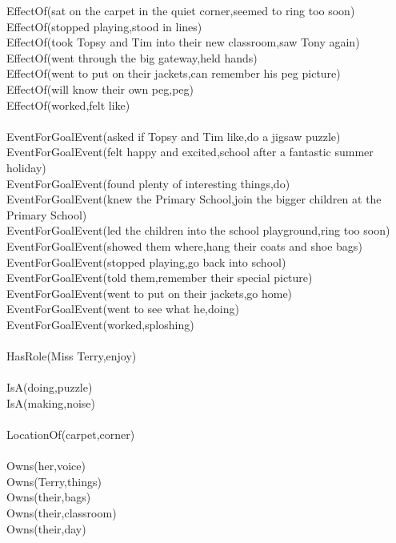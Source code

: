 \begin{multicols}{2}
\begin{footnotesize}
EffectOf(sat on the carpet in the quiet corner,seemed to ring too soon) \\
EffectOf(stopped playing,stood in lines) \\
EffectOf(took Topsy and Tim into their new classroom,saw Tony again) \\
EffectOf(went through the big gateway,held hands) \\
EffectOf(went to put on their jackets,can remember his peg picture) \\
EffectOf(will know their own peg,peg) \\
EffectOf(worked,felt like) \\
~\\
EventForGoalEvent(asked if Topsy and Tim like,do a jigsaw puzzle) \\
EventForGoalEvent(felt happy and excited,school after a fantastic summer holiday) \\
EventForGoalEvent(found plenty of interesting things,do) \\
EventForGoalEvent(knew the Primary School,join the bigger children at the Primary School) \\
EventForGoalEvent(led the children into the school playground,ring too soon) \\
EventForGoalEvent(showed them where,hang their coats and shoe bags) \\
EventForGoalEvent(stopped playing,go back into school) \\
EventForGoalEvent(told them,remember their special picture) \\
EventForGoalEvent(went to put on their jackets,go home) \\
EventForGoalEvent(went to see what he,doing) \\
EventForGoalEvent(worked,sploshing) \\
~\\
HasRole(Miss Terry,enjoy) \\
~\\
IsA(doing,puzzle) \\
IsA(making,noise) \\
~\\
LocationOf(carpet,corner) \\
~\\
Owns(her,voice) \\
Owns(Terry,things) \\
Owns(their,bags) \\
Owns(their,classroom) \\
Owns(their,day) \\

\end{footnotesize}
\end{multicols}
